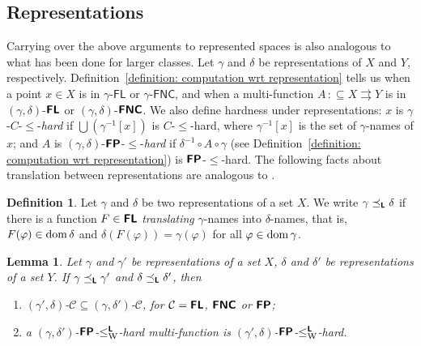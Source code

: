 \documentclass[conference]{IEEEtran}
\newcommand{\classonefont}[1]{\mathsf{#1}}
\newcommand{\classFL}{\classonefont{FL}}
\newcommand{\classFNC}{\classonefont{FNC}}
\newcommand{\classtwofont}[1]{\text{\bfseries \sffamily \upshape #1}}
\newcommand{\classLtwo}{\classtwofont{L}}
\newcommand{\classFLtwo}{\classtwofont{FL}}
\newcommand{\classFNCtwo}{\classtwofont{FNC}}
\newcommand{\classFPtwo}{\classtwofont{FP}}
\newcommand{\redW}{\leq _{\mathrm W}}
\newcommand{\redmF}{\leq _{\mathrm{mF}}}
\newcommand{\redLW}{\redW ^{\classLtwo}}
\newcommand{\redLmF}{\redmF ^{\classLtwo}}
\newcommand{\probCVPtwo}{\mathrm{CVP}^2}
\newcommand{\dom}{\mathop{\rm dom}}
\newtheorem{lemma}[theorem]{Lemma}
\theoremstyle{definition}
\newtheorem{definition}[theorem]{Definition}
\theoremstyle{remark}
\newcommand{\pcolon}{\mathpunct{\,:\subseteq}}
\begin{document}


\subsection{Representations}
\newcommand{\transL}{\preceq_\classLtwo}

Carrying over the above arguments to represented spaces
is also analogous to what has been done \cite{kawamura2012complexity} for larger classes. 
Let $\gamma$ and $\delta$ be representations of $X$ and $Y$, respectively.
Definition~\ref{definition: computation wrt representation} 
tells us when 
a point $x \in X$ is in $\gamma$-$\classFL$ or $\gamma$-$\classFNC$, 
and when a multi-function $A \pcolon X \rightrightarrows Y$ is in
$(\gamma, \delta)$-$\classFLtwo$ or
$(\gamma, \delta)$-$\classFNCtwo$. 
We also define hardness under representations: 
$x$ is $\gamma$-$C$-$\le$-\emph{hard} if
$\bigcup(\gamma^{-1}[x])$ is $C$-$\le$-hard,
where $\gamma^{-1}[x]$ is the set of $\gamma$-names of $x$; 
and $A$ is $(\gamma, \delta)$-$\classFPtwo$-$\le$-\emph{hard}
if $\delta^{-1} \circ A \circ \gamma$ 
(see Definition~\ref{definition: computation wrt representation}) 
is $\classFPtwo$-$\le$-hard.
The following facts
about translation between representations are
analogous to \cite{kawamura2012complexity}. 

\begin{definition}
Let $\gamma$ and $\delta$ be two representations of a set $X$.
We write $\gamma \transL \delta$ if
there is a function $F \in \classFLtwo$ \emph{translating} $\gamma$-names
into $\delta$-names, that is, 
$F (\varphi) \in \dom \delta$ and $\delta(F(\varphi)) = \gamma (\varphi)$ 
for all $\varphi \in \dom \gamma$.
\end{definition}

\begin{lemma}
 Let $\gamma$ and $\gamma'$ be representations of a set $X$, 
 $\delta$ and $\delta'$ be representations of a set $Y$.
 If $\gamma \transL \gamma'$ and $\delta \transL \delta'$, then 
\begin{enumerate}
\item 
$(\gamma', \delta)$-$\mathcal C \subseteq (\gamma, \delta')$-$\mathcal C$, 
for $\mathcal{C} = \classFLtwo$, $\classFNCtwo$ or $\classFPtwo$; 
\item 
a $(\gamma, \delta')$-$\classFPtwo$-$\redLW$-hard multi-function is
$(\gamma', \delta)$-$\classFPtwo$-$\redLW$-hard.
\end{enumerate}
\end{lemma}
\end{document}
